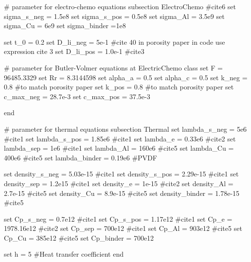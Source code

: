 \begin{DoxyCode}
\textcolor{preprocessor}{# parameter for electro-chemo equations}
subsection ElectroChemo #cite6
\textcolor{keyword}{set} sigma\_s\_neg = 1.5e8
\textcolor{keyword}{set} sigma\_s\_pos = 0.5e8
\textcolor{keyword}{set} sigma\_Al = 3.5e9
\textcolor{keyword}{set} sigma\_Cu = 6e9
\textcolor{keyword}{set} sigma\_binder =1e8

\textcolor{keyword}{set} t\_0 = 0.2
set D\_li\_neg = 5e-1 #cite 40 in porosity paper in code use expression cite 3 
\textcolor{keyword}{set} D\_li\_pos = 1.0e-1 #cite3

\textcolor{preprocessor}{# parameter for Butler-Volmer equations at ElectricChemo class}
\textcolor{keyword}{set} F = 96485.3329
set Rr = 8.3144598
set alpha\_a = 0.5
set alpha\_c = 0.5
set k\_neg = 0.8 #to match porosity paper
\textcolor{keyword}{set} k\_pos = 0.8 #to match porosity paper
\textcolor{keyword}{set} c\_max\_neg = 28.7e-3
\textcolor{keyword}{set} c\_max\_pos = 37.5e-3

end

\textcolor{preprocessor}{# parameter for thermal equations}
subsection Thermal
\textcolor{keyword}{set} lambda\_s\_neg = 5e6 #cite1
\textcolor{keyword}{set} lambda\_s\_pos = 1.85e6  #cite1
\textcolor{keyword}{set} lambda\_e = 0.33e6  #cite2
\textcolor{keyword}{set} lambda\_sep = 1e6  #cite1
\textcolor{keyword}{set} lambda\_Al = 160e6  #cite5
\textcolor{keyword}{set} lambda\_Cu = 400e6  #cite5
\textcolor{keyword}{set} lambda\_binder = 0.19e6 #PVDF

\textcolor{keyword}{set} density\_s\_neg = 5.03e-15  #cite1
\textcolor{keyword}{set} density\_s\_pos = 2.29e-15  #cite1
\textcolor{keyword}{set} density\_sep = 1.2e15  #cite1
\textcolor{keyword}{set} density\_e = 1e-15  #cite2
\textcolor{keyword}{set} density\_Al = 2.7e-15  #cite5
\textcolor{keyword}{set} density\_Cu = 8.9e-15  #cite5
\textcolor{keyword}{set} density\_binder = 1.78e-15  #cite5

\textcolor{keyword}{set} Cp\_s\_neg = 0.7e12  #cite1
\textcolor{keyword}{set} Cp\_s\_pos = 1.17e12  #cite1
\textcolor{keyword}{set} Cp\_e = 1978.16e12  #cite2
\textcolor{keyword}{set} Cp\_sep = 700e12  #cite1
\textcolor{keyword}{set} Cp\_Al = 903e12  #cite5
\textcolor{keyword}{set} Cp\_Cu = 385e12  #cite5
\textcolor{keyword}{set} Cp\_binder = 700e12 

\textcolor{keyword}{set} h = 5 #Heat transfer coefficient
end
            

\end{DoxyCode}
